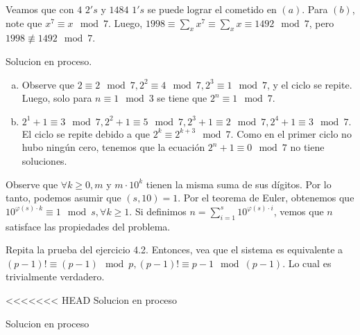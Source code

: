 \begin{sol}
	Veamos que con $4$ $2's$ y $1484$ $1's$ se puede lograr el cometido en $(a)$. Para $(b)$, note que $x^{7} \equiv x \mod 7$. Luego, $1998 \equiv \sum_{x} x^{7} \equiv \sum_{x} x \equiv 1492 \mod 7$, pero $1998 \not\equiv 1492 \mod 7$.
\end{sol}

\begin{sol}
	Solucion en proceso.
\end{sol}

\begin{sol}
	\begin{enumerate}[a.]
		\item Observe que $2 \equiv 2 \mod 7, 2^2 \equiv 4 \mod 7, 2^3 \equiv 1 \mod 7$, y el ciclo se repite. Luego, solo para $n \equiv 1 \mod 3 $ se tiene que $2^n \equiv 1 \mod 7$.
		\item$ 2^1 +1 \equiv 3 \mod 7, 2^2+1 \equiv 5 \mod 7, 2^3 +1 \equiv 2 \mod 7, 2^4+1 \equiv 3 \mod 7. $ El ciclo se repite debido a que $2^k \equiv 2^{k+3} \mod 7$. Como en el primer ciclo no hubo ning\'un cero, tenemos que la ecuaci\'on $2^n +1 \equiv 0 \mod 7 $ no tiene soluciones.
	\end{enumerate}
\end{sol}

\begin{sol}
	Observe que $\forall k \geq 0, m $ y $ m\cdot 10^{k}$ tienen la misma suma de sus d\'igitos. Por lo tanto, podemos asumir que $(s, 10) = 1$. Por el teorema de Euler, obtenemos que $10^{\varphi(s)\cdot k } \equiv 1 \mod s, \forall k \geq 1$. Si definimos $n = \sum_{i=1}^{s} 10^{\varphi(s) \cdot i}$, vemos que $n$ satisface las propiedades del problema.
\end{sol}

\begin{sol}
	Repita la prueba del ejercicio 4.2. Entonces, vea que el sistema es equivalente a $(p-1)! \equiv (p-1) \mod p, (p-1)! \equiv p-1 \mod (p-1)$. Lo cual es trivialmente verdadero.
\end{sol}

\begin{sol}
<<<<<<< HEAD
	Solucion en proceso
\end{sol}

\begin{sol}
	Solucion en proceso
\end{sol}

